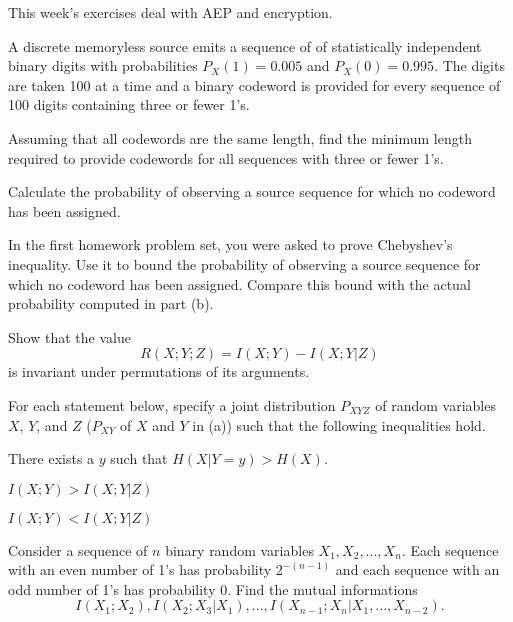 \documentclass[a4paper,10pt,landscape,twocolumn]{scrartcl}
\begin{document}
\practiceproblems

{\sffamily\noindent
This week's exercises deal with AEP and encryption.  \practiceinstructions
}

\begin{exercise}
A discrete memoryless source emits a sequence of of statistically independent binary digits with probabilities $P_X(1) = 0.005$ and $P_X(0) = 0.995$. The digits are taken 100 at a time and a binary codeword is provided for every sequence of 100 digits containing three or fewer 1's.
	\begin{subex}
	Assuming that all codewords are the same length, find the minimum length required to
provide codewords for all sequences with three or fewer 1's.
	\end{subex}
	\begin{subex}
	Calculate the probability of observing a source sequence for which no codeword has
been assigned.
	\end{subex}
	\begin{subex}
	In the first homework problem set, you were asked to prove Chebyshev's inequality.
	Use it to bound the probability of observing a source sequence for
which no codeword has been assigned. Compare this bound with the actual probability computed
in part (b).
	\end{subex}
\end{exercise}



\begin{exercise}
Show that the value
\[
R(X;Y;Z) = I(X;Y) - I(X;Y|Z)
\]
is invariant under permutations of its arguments.
\end{exercise}

\begin{exercise}[]
For each statement below, specify a joint distribution $P_{XYZ}$ of random variables $X$, $Y$, and $Z$ ($P_{XY}$ of $X$ and $Y$ in (a)) such that the following inequalities hold.
\begin{subex}
There exists a $y$ such that $H(X|Y=y) > H(X)$.
\end{subex}
\begin{subex}
$I(X;Y) > I(X;Y|Z)$
\end{subex}
\begin{subex}
$I(X;Y) < I(X;Y|Z)$
\end{subex}
\end{exercise}

\begin{exercise}
Consider a sequence of $n$ binary random variables $X_1, X_2, ..., X_n$.
Each sequence with an even number of 1's has probability $2^{-(n-1)}$ and each sequence with an odd number
of 1's has probability 0. Find the mutual informations
\[
I(X_1;X_2), I(X_2;X_3|X_1), ..., I(X_{n-1};X_n|X_1, ..., X_{n-2}).
\]
\end{exercise}
\vspace{-0.5cm}
\end{document}
